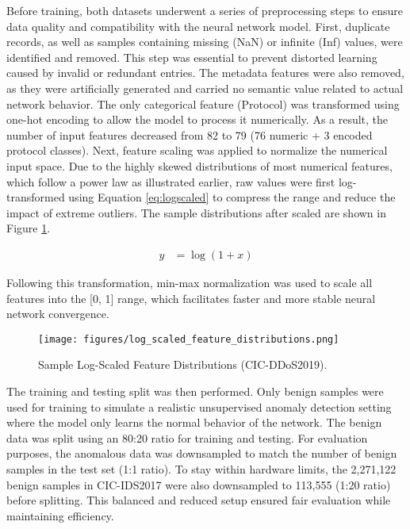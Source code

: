 Before training, both datasets underwent a series of preprocessing steps to ensure data quality and compatibility with the neural network model. First, duplicate records, as well as samples containing missing (NaN) or infinite (Inf) values, were identified and removed. This step was essential to prevent distorted learning caused by invalid or redundant entries. The metadata features were also removed, as they were artificially generated and carried no semantic value related to actual network behavior. The only categorical feature (Protocol) was transformed using one-hot encoding to allow the model to process it numerically. As a result, the number of input features decreased from 82 to 79 (76 numeric + 3 encoded protocol classes). Next, feature scaling was applied to normalize the numerical input space. Due to the highly skewed distributions of most numerical features, which follow a power law as illustrated earlier, raw values were first log-transformed using Equation \ref{eq:logscaled} to compress the range and reduce the impact of extreme outliers. The sample distributions after scaled are shown in Figure \ref{fig:log_scaled_feature_distribution}.

\begin{align} \label{eq:logscaled}
y &= \log(1 + x)
\end{align}

Following this transformation, min-max normalization was used to scale all features into the [0, 1] range, which facilitates faster and more stable neural network convergence.

\begin{figure}[h]
    \centering
    \texttt{[image: figures/log\_scaled\_feature\_distributions.png]}
    \caption{Sample Log-Scaled Feature Distributions (CIC-DDoS2019).}
    \label{fig:log_scaled_feature_distribution}
\end{figure}

The training and testing split was then performed. Only benign samples were used for training to simulate a realistic unsupervised anomaly detection setting where the model only learns the normal behavior of the network. The benign data was split using an 80:20 ratio for training and testing. For evaluation purposes, the anomalous data was downsampled to match the number of benign samples in the test set (1:1 ratio). To stay within hardware limits, the 2,271,122 benign samples in CIC-IDS2017 were also downsampled to 113,555 (1:20 ratio) before splitting. This balanced and reduced setup ensured fair evaluation while maintaining efficiency.


